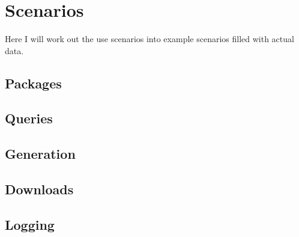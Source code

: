 \newpage
\section{Scenarios}  
Here I will work out the use scenarios into example scenarios filled with actual
data.


\subsection{Packages}









\subsection{Queries}














\subsection{Generation}




\subsection{Downloads}






\subsection{Logging}







